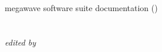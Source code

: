 %
%

%


\def\Next{\vspace{10mm}}
\def\Null{\texttt{NULL}}

\newcommand{\Name}[2]{
{\Large\bf  Name} \bigskip
{\large\bf #1} - #2

\Next}

\newcommand{\Summary}[1]{
{\Large\bf Summary}

#1

\Next}

\newcommand{\Argument}[1]{
{\Large\bf Arguments}

#1

\Next}

\newcommand{\Description}{
{\Large\bf Description}

\Next}

\newcommand{\Example}{
{\Large\bf Example}

\Next}


\begin{titlepage}
\begin{center}
megawave software suite documentation (\myversion)\\
\vspace{1cm}
{\large\bf \myvolume}\\
\vspace{2cm}
{\huge\scshape \mytitle}\\
\vspace{1cm}
{\large\em edited by \myauthor}\\
\end{center}
\newpage
\begin{center}
\ \\
\vspace{10cm}
\copyinfo
\end{center}
\end{titlepage}

\pagestyle{headings}
